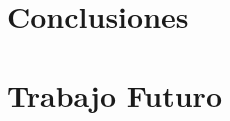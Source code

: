 \label{chap:conclusion}


\section{Conclusiones}
\label{conclusion:webb}


\section{Trabajo Futuro}
\label{conclusion:futuro}

